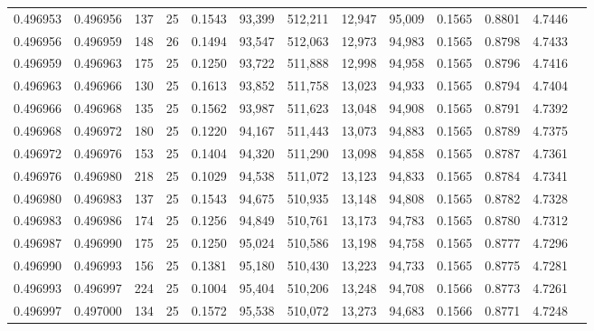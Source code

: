 \begin{tabular}{rrrrrrrrrrrrr}
0.496953 & 0.496956 & 137 &  25 &                                     0.1543 &  93,399 & 512,211 &  12,947 &  95,009 & 0.1565 & 0.8801 & 4.7446 \\
0.496956 & 0.496959 & 148 &  26 &                                     0.1494 &  93,547 & 512,063 &  12,973 &  94,983 & 0.1565 & 0.8798 & 4.7433 \\
0.496959 & 0.496963 & 175 &  25 &                                     0.1250 &  93,722 & 511,888 &  12,998 &  94,958 & 0.1565 & 0.8796 & 4.7416 \\
0.496963 & 0.496966 & 130 &  25 &                                     0.1613 &  93,852 & 511,758 &  13,023 &  94,933 & 0.1565 & 0.8794 & 4.7404 \\
0.496966 & 0.496968 & 135 &  25 &                                     0.1562 &  93,987 & 511,623 &  13,048 &  94,908 & 0.1565 & 0.8791 & 4.7392 \\
0.496968 & 0.496972 & 180 &  25 &                                     0.1220 &  94,167 & 511,443 &  13,073 &  94,883 & 0.1565 & 0.8789 & 4.7375 \\
0.496972 & 0.496976 & 153 &  25 &                                     0.1404 &  94,320 & 511,290 &  13,098 &  94,858 & 0.1565 & 0.8787 & 4.7361 \\
0.496976 & 0.496980 & 218 &  25 &                                     0.1029 &  94,538 & 511,072 &  13,123 &  94,833 & 0.1565 & 0.8784 & 4.7341 \\
0.496980 & 0.496983 & 137 &  25 &                                     0.1543 &  94,675 & 510,935 &  13,148 &  94,808 & 0.1565 & 0.8782 & 4.7328 \\
0.496983 & 0.496986 & 174 &  25 &                                     0.1256 &  94,849 & 510,761 &  13,173 &  94,783 & 0.1565 & 0.8780 & 4.7312 \\
0.496987 & 0.496990 & 175 &  25 &                                     0.1250 &  95,024 & 510,586 &  13,198 &  94,758 & 0.1565 & 0.8777 & 4.7296 \\
0.496990 & 0.496993 & 156 &  25 &                                     0.1381 &  95,180 & 510,430 &  13,223 &  94,733 & 0.1565 & 0.8775 & 4.7281 \\
0.496993 & 0.496997 & 224 &  25 &                                     0.1004 &  95,404 & 510,206 &  13,248 &  94,708 & 0.1566 & 0.8773 & 4.7261 \\
0.496997 & 0.497000 & 134 &  25 &                                     0.1572 &  95,538 & 510,072 &  13,273 &  94,683 & 0.1566 & 0.8771 & 4.7248 \\

\end{tabular}
